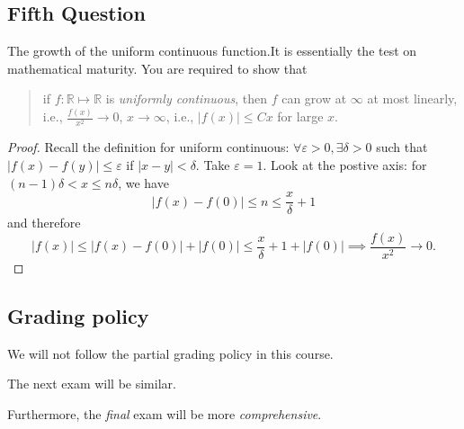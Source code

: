 \subsection{Fifth Question}
The growth of the uniform continuous function.It is essentially the test on mathematical maturity. You are required to show that 
\begin{quotation}
if $f:\mathbb{R}\mapsto\mathbb{R}$ is \emph{uniformly continuous}, then $f$ can grow at $\infty$ at most linearly, i.e., $\frac{f(x)}{x^2}\to0$, $x\to\infty$, i.e., $|f(x)|\le Cx$ for large $x$.
\end{quotation}
\begin{proof}
Recall the definition for uniform continuous: $\forall\varepsilon>0,\exists\delta>0$ such that $|f(x) - f(y)|\le\varepsilon$ if $|x-y|<\delta$. Take $\varepsilon=1$. Look at the postive axis: for $(n-1)\delta<x\le n\delta$, we have
\[
|f(x) - f(0)|\le n\le\frac{x}{\delta}+1
\]
and therefore
\[
|f(x)|\le |f(x)-f(0)|+|f(0)|\le \frac{x}{\delta}+1+|f(0)|\implies\frac{f(x)}{x^2}\to0.
\]

\end{proof}







\subsection{Grading policy}
We will not follow the partial grading policy in this course. 

The next exam will be similar.

Furthermore, the \emph{final} exam will be more \emph{comprehensive}.





















